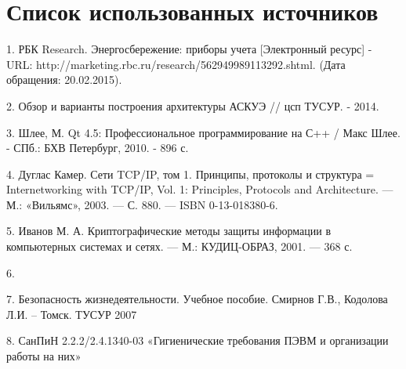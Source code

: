 


 
 
 \newpage
 \tableofcontents
 
 
 
 
 
 
 
 \newpage
 
 
 
 \newpage
 \section*{Список использованных источников}
 1. РБК Research. Энергосбережение: приборы учета [Электронный ресурс] - URL: http://marketing.rbc.ru/research/562949989113292.shtml. (Дата обращения: 20.02.2015).
 
 2. Обзор и варианты построения архитектуры АСКУЭ // цсп ТУСУР. - 2014.
 
 3. Шлее, М. Qt 4.5: Профессиональное программирование на С++ / Макс Шлее. - СПб.: БХВ Петербург, 2010. - 896 с.
 
 4. Дуглас Камер. Сети TCP/IP, том 1. Принципы, протоколы и структура = Internetworking with TCP/IP, Vol. 1: Principles, Protocols and Architecture. — М.: «Вильямс», 2003. — С. 880. — ISBN 0-13-018380-6.
 
 5. Иванов М. А. Криптографические методы защиты информации в компьютерных системах и сетях. — М.: КУДИЦ-ОБРАЗ, 2001. — 368 с.
 
 6. %
 
 7. Безопасность жизнедеятельности. Учебное пособие. Смирнов Г.В., Кодолова Л.И. – Томск. ТУСУР 2007
 
 8. СанПиН 2.2.2/2.4.1340-03 «Гигиенические требования ПЭВМ и организации работы на них»


